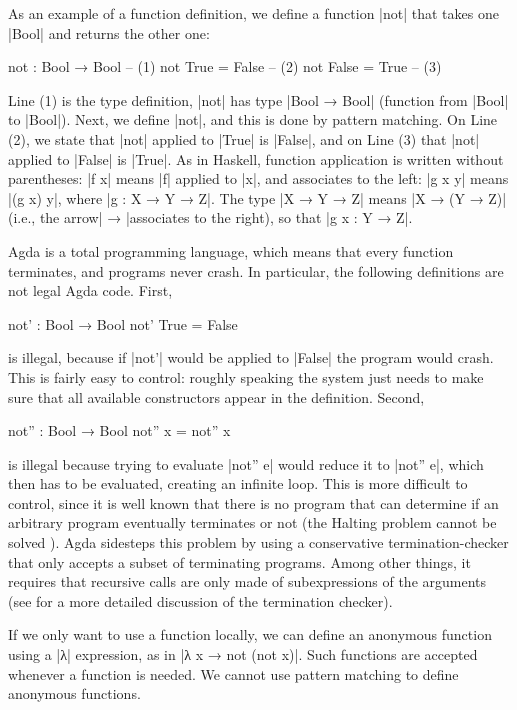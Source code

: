 As an example of a function definition, we define a function |not| that takes one |Bool| and returns the other one:
\begin{code}
not : Bool → Bool    -- (1)
not True   = False   -- (2)
not False  = True    -- (3)
\end{code}
Line (1) is the type definition, |not| has type |Bool → Bool| (function from |Bool| to |Bool|). Next, we define |not|, and this is done by pattern matching. On Line (2), we state that |not| applied to |True| is |False|, and on Line (3) that |not| applied to |False| is |True|. As in Haskell, function application is written without parentheses: |f x| means |f| applied to |x|, and associates to the left: |g x y| means |(g x) y|, where |g : X → Y → Z|. The type |X → Y → Z| means |X → (Y → Z)| (i.e., the arrow\;\;\;| → |\;\;\;associates to the right), so that |g x : Y → Z|.

Agda is a total programming language, which means that every function terminates, and programs never crash. In particular, the following definitions are not legal Agda code. First,
\begin{code}
not' : Bool → Bool
not' True = False
\end{code}
is illegal, because if |not'| would be applied to |False| the program would crash. This is fairly easy to control: roughly speaking the system just needs to make sure that all available constructors appear in the definition. Second,
\begin{code}
not'' : Bool → Bool
not'' x = not'' x
\end{code}
is illegal because trying to evaluate |not'' e| would reduce it to |not'' e|, which then has to be evaluated, creating an infinite loop. This is more difficult to control, since it is well known that there is no program that can determine if an arbitrary program eventually terminates or not (the Halting problem cannot be solved \cite{Turing}). Agda sidesteps this problem by using a conservative termination-checker that only accepts a subset of terminating programs. Among other things, it requires that recursive calls are only made of subexpressions of the arguments  (see \cite{AgdaRefManTot} for a more detailed discussion of the termination checker).

If we only want to use a function locally, we can define an anonymous function using a |λ| expression, as in |λ x → not (not x)|. Such functions are accepted whenever a function is needed. We cannot use pattern matching to define anonymous functions. 

